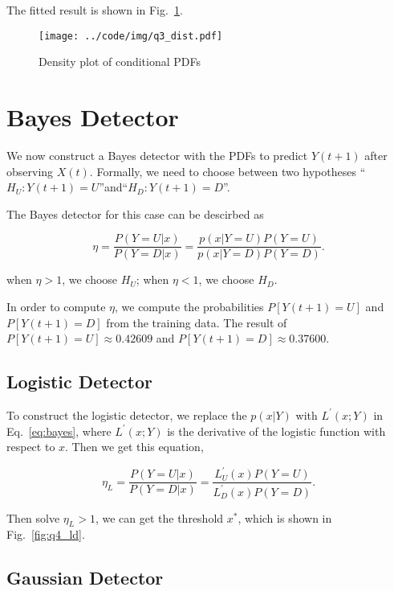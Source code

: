 \documentclass[runningheads]{llncs}
\begin{document}
The fitted result is shown in Fig.~\ref{fig:q3dist}.

\begin{figure}[!htb]
    \begin{center}
        \texttt{[image: ../code/img/q3\_dist.pdf]}
    \end{center}
    \caption{Density plot of conditional PDFs}
    \label{fig:q3dist}
\end{figure}


\section{Bayes Detector}\label{sec:4}

We now construct a Bayes detector with the PDFs to predict $Y(t + 1)$ after observing $X(t)$. 
Formally, we need to choose between two hypotheses “$H_U: Y(t+1)=U$”and“$H_D: Y(t+1)=D$”.

The Bayes detector for this case can be descirbed as

\begin{equation}
    \label{eq:bayes}
    \eta=\frac{P(Y=U|x)}{P(Y=D|x)}=\frac{p(x|Y=U)P(Y=U)}{p(x|Y=D)P(Y=D)}.
\end{equation}

when $\eta > 1$, we choose $H_U$; when $\eta < 1$, we choose $H_D$.

In order to compute $\eta$, we compute the probabilities $P[Y(t+1)=U]$ and $P[Y(t+1)=D]$ from the training data. 
The result of $P[Y(t+1)=U]\approx 0.42609$ and $P[Y(t+1)=D]\approx 0.37600$.

\subsection{Logistic Detector}

To construct the logistic detector, we replace the $p(x|Y)$ with $L^{'}(x;Y)$ in Eq.~\eqref{eq:bayes}, where $L^{'}(x;Y)$ is the derivative of the logistic function with respect to $x$.
Then we get this equation,

\begin{equation}
    \label{eq:bayes-logistic}
    \eta_L=\frac{P(Y=U|x)}{P(Y=D|x)}=\frac{L^{'}_U(x)P(Y=U)}{L^{'}_D(x)P(Y=D)}.
\end{equation}

Then solve $\eta_L > 1$, we can get the threshold $x^*$, which is shown in Fig.~\ref{fig:q4_ld}.

\subsection{Gaussian Detector}
\end{document}
